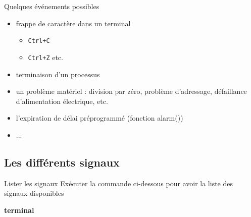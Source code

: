 \documentclass[9pt]{beamer}
\newenvironment{code}[1]{%
    \begin{bclogo}[couleur=backcolour, couleurTexte=black ,couleurBord=blue ,couleurBarre=black, ombre=false,epBord=0.9,logo=\#,arrondi=0.1]{{\bfseries #1}}%
    }%
    {%
    \end{bclogo}
}%
\begin{document}
\begin{frame}
Quelques événements possibles
\begin{itemize}[<+->]
    \item frappe de caractère dans un terminal
    \begin{itemize}
        \item  \texttt{Ctrl+C} 
        \item \texttt{Ctrl+Z} etc.
    \end{itemize}
    \item terminaison d'un processus
    \item un problème matériel : division par zéro, problème d'adressage, défaillance d'alimentation électrique, etc.
    \item l'expiration de délai préprogrammé (fonction alarm())
    \item ...
\end{itemize}
\end{frame}

\subsection{Les différents signaux}
 
\begin{frame}{Lister les signaux}
Exécuter la commande ci-dessous pour avoir la liste des signaux disponibles
\begin{code}{terminal}
\ex
\end{code}
\end{frame}
\end{document}
